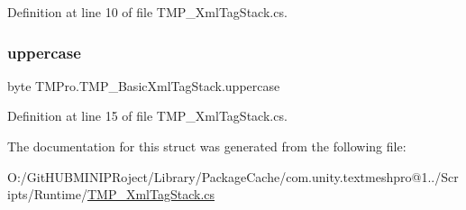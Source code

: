 Definition at line 10 of file T\+M\+P\+\_\+\+Xml\+Tag\+Stack.\+cs.

\mbox{\label{struct_t_m_pro_1_1_t_m_p___basic_xml_tag_stack_a207b4f8ec865f6a09e3c176e207df869}} 
\subsubsection{\texorpdfstring{uppercase}{uppercase}}
{\footnotesize\ttfamily byte T\+M\+Pro.\+T\+M\+P\+\_\+\+Basic\+Xml\+Tag\+Stack.\+uppercase}



Definition at line 15 of file T\+M\+P\+\_\+\+Xml\+Tag\+Stack.\+cs.



The documentation for this struct was generated from the following file\+:\begin{DoxyCompactItemize}
\item 
O\+:/\+Git\+H\+U\+B\+M\+I\+N\+I\+P\+Roject/\+Library/\+Package\+Cache/com.\+unity.\+textmeshpro@1../\+Scripts/\+Runtime/\mbox{\hyperlink{_t_m_p___xml_tag_stack_8cs}{T\+M\+P\+\_\+\+Xml\+Tag\+Stack.\+cs}}\end{DoxyCompactItemize}
